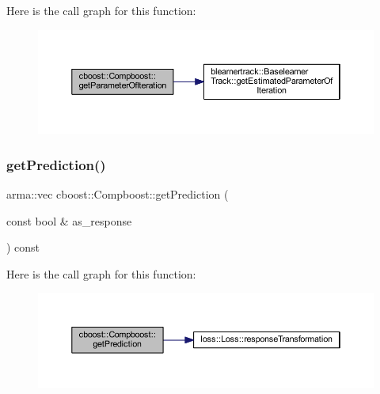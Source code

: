 Here is the call graph for this function\+:
\nopagebreak
\begin{figure}[H]
\begin{center}
\leavevmode
\includegraphics[width=350pt]{classcboost_1_1_compboost_a97b02aa81981e08658d896ff9798b5d0_cgraph}
\end{center}
\end{figure}
\mbox{\label{classcboost_1_1_compboost_a741143ae1cb41c54346e19f8bec3454d}} 
\subsubsection{\texorpdfstring{get\+Prediction()}{getPrediction()}}
{\footnotesize\ttfamily arma\+::vec cboost\+::\+Compboost\+::get\+Prediction (\begin{DoxyParamCaption}\item[{const bool \&}]{as\+\_\+response }\end{DoxyParamCaption}) const}

Here is the call graph for this function\+:
\nopagebreak
\begin{figure}[H]
\begin{center}
\leavevmode
\includegraphics[width=350pt]{classcboost_1_1_compboost_a741143ae1cb41c54346e19f8bec3454d_cgraph}
\end{center}
\end{figure}
\mbox{\label{classcboost_1_1_compboost_a028c381577a136f8601aaf8433cf606c}} 
